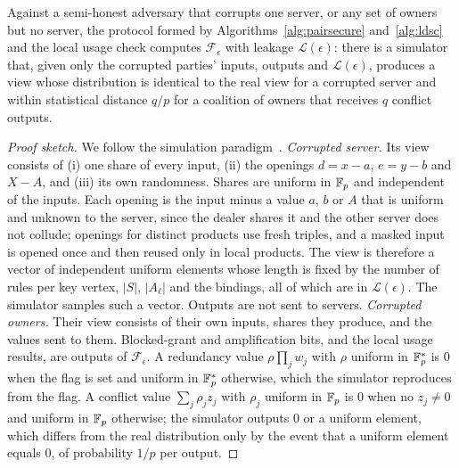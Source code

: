 \begin{theorem}[Security]\label{thm:security}
Against a semi-honest adversary that corrupts one server, or any set of owners but no server, the protocol formed by Algorithms~\ref{alg:pairsecure} and~\ref{alg:ldsc} and the local usage check computes $\mathcal{F}_\epsilon$ with leakage $\mathcal{L}(\epsilon)$: there is a simulator that, given only the corrupted parties' inputs, outputs and $\mathcal{L}(\epsilon)$, produces a view whose distribution is identical to the real view for a corrupted server and within statistical distance $q/p$ for a coalition of owners that receives $q$ conflict outputs.
\end{theorem}
\begin{proof}[Proof sketch]
We follow the simulation paradigm~\cite{goldreich2004foundations}. \emph{Corrupted server.} Its view consists of (i) one share of every input, (ii) the openings $d = x - a$, $e = y - b$ and $X - A$, and (iii) its own randomness. Shares are uniform in $\mathbb{F}_p$ and independent of the inputs. Each opening is the input minus a value $a$, $b$ or $A$ that is uniform and unknown to the server, since the dealer shares it and the other server does not collude; openings for distinct products use fresh triples, and a masked input is opened once and then reused only in local products. The view is therefore a vector of independent uniform elements whose length is fixed by the number of rules per key vertex, $|S|$, $|A_\ell|$ and the bindings, all of which are in $\mathcal{L}(\epsilon)$. The simulator samples such a vector. Outputs are not sent to servers.
\emph{Corrupted owners.} Their view consists of their own inputs, shares they produce, and the values sent to them. Blocked-grant and amplification bits, and the local usage results, are outputs of $\mathcal{F}_\epsilon$. A redundancy value $\rho \prod_j w_j$ with $\rho$ uniform in $\mathbb{F}_p^{*}$ is $0$ when the flag is set and uniform in $\mathbb{F}_p^{*}$ otherwise, which the simulator reproduces from the flag. A conflict value $\sum_j \rho_j z_j$ with $\rho_j$ uniform in $\mathbb{F}_p$ is $0$ when no $z_j \neq 0$ and uniform in $\mathbb{F}_p$ otherwise; the simulator outputs $0$ or a uniform element, which differs from the real distribution only by the event that a uniform element equals $0$, of probability $1/p$ per output.
\end{proof}


